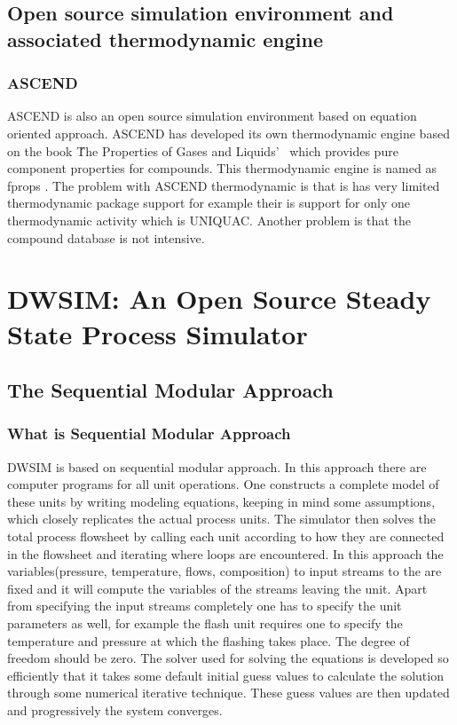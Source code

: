 \documentclass[12pt]{report}
\begin{document}
\section{Open source simulation environment and associated thermodynamic engine}
\subsection{ASCEND}
ASCEND is also an open source simulation environment based on equation oriented approach. ASCEND has developed its own thermodynamic engine based on the book \'The Properties of Gases and Liquids'\ \cite{ascend} which provides pure component properties for compounds. This thermodynamic engine is named as fprops  \cite{fprops}. The problem with ASCEND thermodynamic is that is has very limited thermodynamic package support for example their is support for only one thermodynamic activity which is UNIQUAC. Another problem is that the compound database is not intensive.



\chapter{DWSIM: An Open Source Steady State Process Simulator}
\section{The Sequential Modular Approach} \cite{SM}
\subsection{What is Sequential Modular Approach}
DWSIM is based on sequential modular approach. In this approach there are computer programs for all unit operations. One constructs a complete model of these units by writing modeling equations, keeping in mind some assumptions, which closely replicates the actual process units. The simulator then solves the total process flowsheet by calling each unit according to how they are connected in the flowsheet and iterating where loops are encountered. In this approach the variables(pressure, temperature, flows, composition) to input streams to the are fixed and it will compute the variables of the streams leaving the unit. Apart from specifying the input streams completely one has to specify the unit parameters as well, for example the flash unit requires one to specify the temperature and pressure at which the flashing takes place. The degree of freedom should be zero. The solver used for solving the equations is developed so efficiently that it takes some default initial guess values to calculate the solution through some numerical iterative technique. These guess values are then updated and progressively the system converges.
\end{document}

